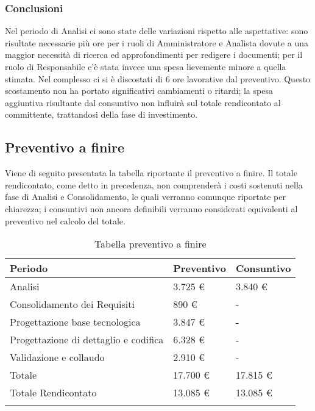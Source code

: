 \subsubsection{Conclusioni}
Nel periodo di Analisi ci sono state delle variazioni rispetto alle aspettative: sono risultate necessarie più ore per i ruoli di Amministratore e Analista dovute a una maggior necessità di ricerca ed approfondimenti per redigere i documenti; per il ruolo di Responsabile c'è stata invece una spesa lievemente minore a quella stimata. Nel complesso ci si è discostati di 6 ore lavorative dal preventivo. Questo scostamento non ha portato significativi cambiamenti o ritardi; la spesa aggiuntiva risultante dal consuntivo non influirà sul totale rendicontato al committente, trattandosi della fase di investimento.
\subsection{Preventivo a finire}
Viene di seguito presentata la tabella riportante il preventivo a finire. Il totale rendicontato, come detto in precedenza, non comprenderà i costi sostenuti nella fase di Analisi e Consolidamento, le quali verranno comunque riportate per chiarezza; i consuntivi non ancora definibili verranno considerati equivalenti al preventivo nel calcolo del totale.
\begin{center}
	\renewcommand{\arraystretch}{1.5}
	\begin{longtable}[H]{  p{4cm}  p{2.5cm} p{2.5cm}  }
		\rowcolor{tableHeadYellow}
		\textbf{Periodo}   & \textbf{Preventivo} & \textbf{Consuntivo} \\ 
		\endhead
		Analisi 	& 3.725 \euro & 3.840 \euro \\
		Consolidamento dei Requisiti & 890 \euro	& - \\
		Progettazione base tecnologica & 3.847 \euro	& - \\
		Progettazione di dettaglio e codifica & 6.328 \euro	& - \\
		Validazione e collaudo	& 2.910 \euro 	& - \\
		Totale & 17.700 \euro	& 17.815 \euro \\
		Totale Rendicontato	& 13.085 \euro	& 13.085 \euro \\
		\rowcolor{white}
		\caption{Tabella preventivo a finire}
	\end{longtable}
\end{center}
